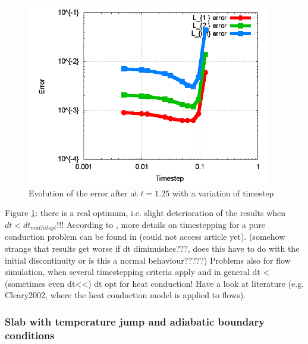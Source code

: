\documentclass{report}
\begin{document}
\begin{figure}[h]  
  \label{fig:PureHeat_dtVerification}
  \centering
  \includegraphics[width=0.95\textwidth]{Graphics/results/PureHeatConduction/ErrorTimestep}
  \caption{Evolution of the error after at $t=1.25$ with a variation of timestep}
\end{figure}

Figure \ref{fig:PureHeat_dtVerification}: there is a real optimum, i.e. slight deterioration of the results when $dt<dt_{mathit{opt}}$!!! According to \cite{Cleary1999}, more details on timestepping for a pure conduction problem can be found in \cite{} (could not access article yet).
(somehow strange that results get worse if dt diminuishes???, does this have to do with the initial discontinuity or is this a normal behaviour?????)
Problems also for flow simulation, when several timestepping criteria apply and in general dt < (sometimes even dt<<) dt opt for heat conduction! Have a look at literature (e.g. Cleary2002, where the heat conduction model is applied to flows).

\subsubsection{Slab with temperature jump and adiabatic boundary conditions}
\end{document}
